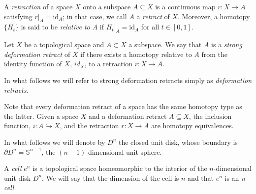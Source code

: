 \bigskip

A \textit{retraction} of a space $X$ onto a subspace $A\subseteq X$ is a continuous map $r:X\to A$ satisfying $r|_A= \text{id}_A$; in that case, we call $A$ a \textit{retract} of $X$. Moreover, a homotopy $\{H_t\}$ is said to be \textit{relative to A} if $H_t|_A=\text{id}_A$ for all $t\in[0,1]$.

\begin{definition}
Let $X$ be a topological space and $A \subset X$ a subspace. We say that $A$ is a
\textit{strong deformation retract} of $X$ if there exists a homotopy relative to $A$ from the identity function of $X$, $id_X$, to a retraction $r: X \to A$.
\end{definition}

\begin{nota}
    In what follows we will refer to strong deformation retracts simply as \textit{deformation retracts}.
\end{nota}

\begin{remark}
    Note that every deformation retract of a space has the same homotopy type as the latter. Given a space $X$ and a deformation retract $A\subseteq X$, the inclusion function, $i: A\hookrightarrow X$, and the retraction $r: X \to A$ are homotopy equivalences.
\end{remark}

\bigskip

In what follows we will denote by $D^n$ the closed unit disk, whose boundary is $\partial D^n=\mathbb{S}^{n-1}$, the $(n-1)$-dimensional unit sphere.

\begin{definition}
    A \textit{cell} $e^n$ is a topological space homeomorphic to the interior of the $n$-dimensional unit disk $D^n$. We will say that the dimension of the cell is $n$ and that $e^n$ is an \textit{n-cell}.
\end{definition}

\bigskip

